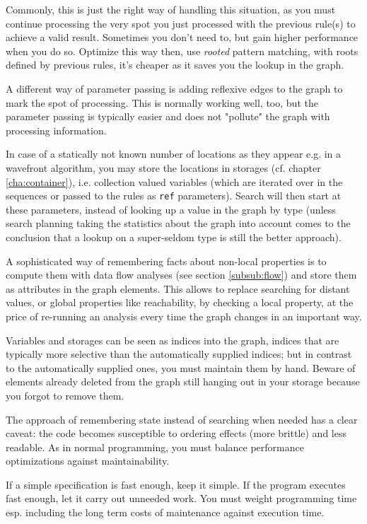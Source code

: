 Commonly, this is just the right way of handling this situation, 
as you must continue processing the very spot you just processed with the previous rule(s) to achieve a valid result.
Sometimes you don't need to, but gain higher performance when you do so.
Optimize this way then, use \emph{rooted} pattern matching, with roots defined by previous rules, it's cheaper as it saves you the lookup in the graph.

A different way of parameter passing is adding reflexive edges to the graph to mark the spot of processing.
This is normally working well, too, but the parameter passing is typically easier and does not "pollute" the graph with processing information.

In case of a statically not known number of locations as they appear e.g. in a wavefront algorithm, you may store the locations in storages (cf. chapter \ref{cha:container}), i.e. collection valued variables (which are iterated over in the sequences or passed to the rules as \texttt{ref} parameters).
Search will then start at these parameters, instead of looking up a value in the graph by type (unless search planning taking the statistics about the graph into account comes to the conclusion that a lookup on a super-seldom type is still the better approach).

A sophisticated way of remembering facts about non-local properties is to compute them with data flow analyses (see section \ref{subsub:flow}) and store them as attributes in the graph elements.
This allows to replace searching for distant values, or global properties like reachability, by checking a local property, at the price of re-running an analysis every time the graph changes in an important way.

Variables and storages can be seen as indices into the graph, indices that are typically more selective than the automatically supplied indices; 
but in contrast to the automatically supplied ones, you must maintain them by hand.
Beware of elements already deleted from the graph still hanging out in your storage because you forgot to remove them.

The approach of remembering state instead of searching when needed has a clear caveat: the code becomes susceptible to ordering effects (more brittle) and less readable. 
As in normal programming, you must balance performance optimizations against maintainability.

\begin{note}
If a simple specification is fast enough, keep it simple.
If the program executes fast enough, let it carry out unneeded work.
You must weight programming time esp. including the long term costs of maintenance against execution time.
\end{note}

